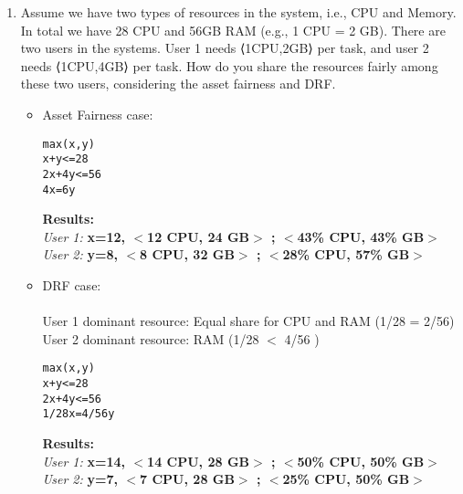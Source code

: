 \documentclass[]{report}
\begin{document}
\begin{enumerate}
 
 \item Assume we have two types of resources in the system, i.e., CPU and Memory. In total we have 28 CPU and 56GB RAM (e.g., 1 CPU = 2 GB). There are two users in the systems. User 1 needs ⟨1CPU,2GB⟩ per task, and user 2 needs ⟨1CPU,4GB⟩ per task. How do you share the resources fairly among these two users, considering the asset fairness and DRF.\\
\begin{itemize}
    \item Asset Fairness case: 
\begin{verbatim}
max(x,y)
x+y<=28
2x+4y<=56
4x=6y
\end{verbatim}
\textbf{Results:}\\
\textit{User 1:} \textbf{x=12, $<$12 CPU, 24 GB$>$ ; $<$43\% CPU, 43\% GB$>$}\\
\textit{User 2:} \textbf{ y=8, $<$8 CPU, 32 GB$>$ ; $<$28\% CPU, 57\% GB$>$}\\
 \item DRF case: \\\\
 User 1 dominant resource: Equal share for CPU and RAM (1/28 = 2/56)\\
 User 2 dominant resource: RAM (1/28 $<$ 4/56 )
\begin{verbatim}
max(x,y)
x+y<=28
2x+4y<=56
1/28x=4/56y
\end{verbatim}
\textbf{Results:}\\
\textit{User 1:} \textbf{x=14, $<$14 CPU, 28 GB$>$ ; $<$50\% CPU, 50\% GB$>$}\\
\textit{User 2:} \textbf{y=7, $<$7 CPU, 28 GB$>$ ; $<$25\% CPU, 50\% GB$>$}
\end{itemize}


\end{enumerate}
\end{document}
